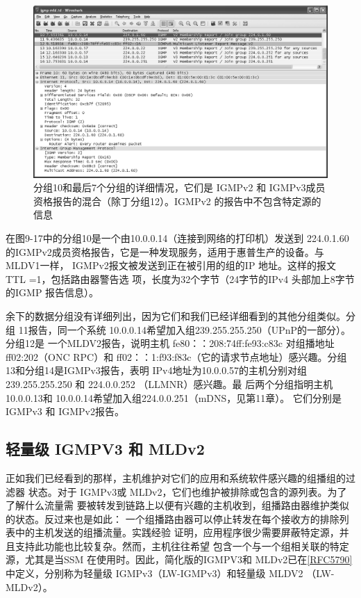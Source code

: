 \begin{figure}[ht]
    \centering
	\includegraphics[width=1.0\textwidth]{imgs/9/9-17.png}
	\caption{分组10和最后7个分组的详细情况，它们是 IGMPv2 和 IGMPv3成员资格报告的混合（除丁分组12）。IGMPv2 的报告中不包含特定源的信息}
\end{figure}
在图9-17中的分组10是一个由10.0.0.14（连接到网络的打印机）发送到 224.0.1.60
的IGMPv2成员资格报告，它是一种发现服务，适用于惠普生产的设备。与MLDV1一样，
IGMPv2报文被发送到正在被引用的组的IP 地址。这样的报文 TTL =1，包括路由器警告选
项，长度为32个字节（24字节的IPv4 头部加上8字节的IGMP 报告信息）。

余下的数据分组没有详细列出，因为它们和我们已经详细看到的其他分组类似。分组
11报告，同一个系统 10.0.0.14希望加入组239.255.255.250（UPnP的一部分）。分组12是
一个MLDV2报告，说明主机 fe80：：208:74ff:fe93:c83c 对组播地址 ff02:202（ONC RPC）和
ff02：：1:f93:f83c（它的请求节点地址）感兴趣。分组13和分组14是IGMPv3报告，表明
IPv4地址为10.0.0.57的主机分别对组239.255.255.250 和 224.0.0.252 （LLMNR）感兴趣。最
后两个分组指明主机 10.0.0.13和 10.0.0.14希望加入组224.0.0.251（mDNS，见第11章）。
它们分别是 IGMPv3 和 IGMPv2报告。

\subsection{轻量级 IGMPV3 和 MLDv2}
正如我们已经看到的那样，主机维护对它们的应用和系统软件感兴趣的组播组的过滤器
状态。对于 IGMPv3或 MLDv2，它们也维护被排除或包含的源列表。为了了解什么流量需
要被转发到链路上以便有兴趣的主机收到，组播路由器维护类似的状态。反过来也是如此：
一个组播路由器可以停止转发在每个接收方的排除列表中的主机发送的组播流量。实践经验
证明，应用程序很少需要屏蔽特定源，并且支持此功能也比较复杂。然而，主机往往希望
包含一个与一个组相关联的特定源，尤其是当SSM 在使用时。因此，简化版的IGMPV3和
MLDv2已在\href{https://www.rfc-editor.org/rfc/rfc5790}{[RFC5790]}中定义，分别称为轻量级 IGMPv3（LW-IGMPv3）和轻量级 MLDV2
（LW-MLDv2）。

